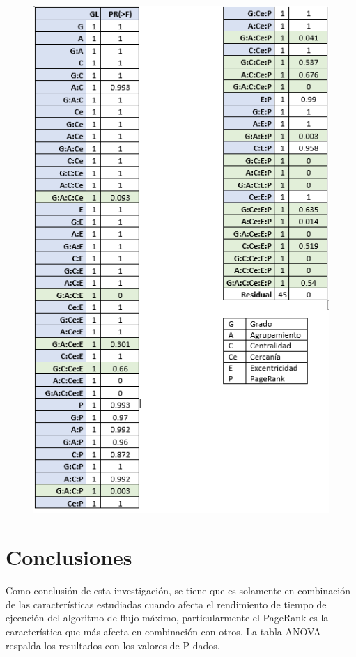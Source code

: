 \documentclass{article}
\begin{document}
\begin{figure}[H]
    \includegraphics[width=\textwidth]{resultados}
    \label{fig:matriz}
\end{figure}

\section{Conclusiones}
Como conclusión de esta investigación, se tiene que es solamente en combinación de las características estudiadas cuando afecta el rendimiento de tiempo de ejecución del algoritmo de flujo máximo, particularmente el PageRank es la característica que más afecta en combinación con otros. La tabla ANOVA respalda los resultados con los valores de P dados.



\end{document}
